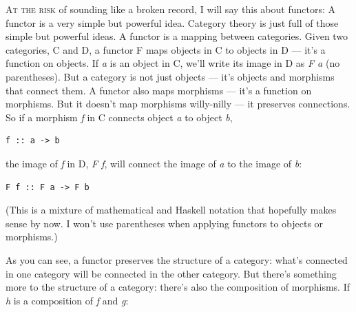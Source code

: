 \lettrine[lhang=0.17]{A}{t the risk} of sounding like a broken record, I will say this about
functors: A functor is a very simple but powerful idea. Category theory
is just full of those simple but powerful ideas. A functor is a mapping
between categories. Given two categories, C and D, a functor F maps
objects in C to objects in D --- it's a function on objects. If \emph{a}
is an object in C, we'll write its image in D as \emph{F a} (no
parentheses). But a category is not just objects --- it's objects and
morphisms that connect them. A functor also maps morphisms --- it's a
function on morphisms. But it doesn't map morphisms willy-nilly --- it
preserves connections. So if a morphism \emph{f} in C connects object
\emph{a} to object \emph{b},

\begin{Verbatim}[commandchars=\\\{\}]
f :: a -> b
\end{Verbatim}
the image of \emph{f} in D, \emph{F f}, will connect the image of
\emph{a} to the image of \emph{b}:

\begin{Verbatim}[commandchars=\\\{\}]
F f :: F a -> F b
\end{Verbatim}
(This is a mixture of mathematical and Haskell notation that hopefully
makes sense by now. I won't use parentheses when applying functors to
objects or morphisms.)

\begin{figure}[H]
\centering
{}
\end{figure}

\noindent
As you can see, a
functor preserves the structure of a category: what's connected in one
category will be connected in the other category. But there's something
more to the structure of a category: there's also the composition of
morphisms. If \emph{h} is a composition of \emph{f} and \emph{g}:

